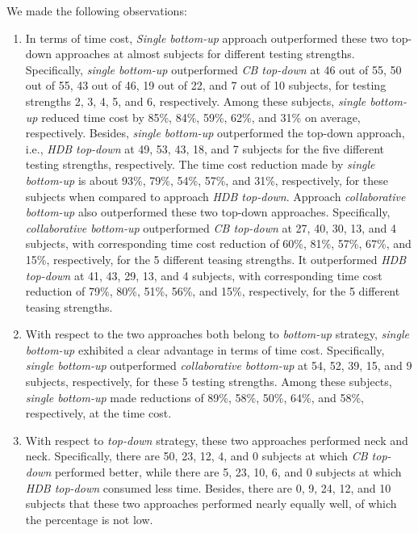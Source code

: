 \documentclass[conference]{IEEEtran}
\theoremstyle{definition}
\begin{document}
We made the following observations:
 \begin{enumerate}

 \item In terms of time cost, \emph{Single bottom-up} approach outperformed these two top-down approaches at almost subjects for different testing strengths.  Specifically, \emph{single bottom-up} outperformed \emph{CB top-down} at 46 out of 55, 50 out of 55, 43 out of 46, 19 out of 22, and 7 out of 10 subjects, for testing strengths 2, 3, 4, 5, and 6, respectively.
 Among these subjects, \emph{single bottom-up} reduced time cost by 85\%, 84\%, 59\%, 62\%, and 31\% on average, respectively. Besides, \emph{single bottom-up} outperformed the top-down approach, i.e., \emph{HDB top-down} at 49, 53, 43, 18, and 7 subjects for the five different testing strengths, respectively. The time cost reduction made by \emph{single bottom-up} is about 93\%, 79\%, 54\%, 57\%,  and  31\%, respectively, for these subjects when compared to approach \emph{HDB top-down}.  Approach \emph{collaborative bottom-up} also outperformed these two top-down approaches. Specifically, \emph{collaborative bottom-up} outperformed \emph{CB top-down} at 27, 40, 30, 13, and 4 subjects, with corresponding time cost reduction of 60\%, 81\%, 57\%, 67\%, and 15\%, respectively, for the 5 different teasing strengths.  It outperformed \emph{HDB top-down} at 41, 43, 29, 13, and 4 subjects, with corresponding time cost reduction of 79\%, 80\%, 51\%, 56\%, and 15\%, respectively, for the 5 different teasing strengths.

 \item With respect to the two approaches both belong to \emph{bottom-up} strategy, \emph{single bottom-up} exhibited a clear advantage in terms of time cost. Specifically, \emph{single bottom-up} outperformed  \emph{collaborative bottom-up}  at 54, 52, 39, 15, and 9 subjects, respectively, for these 5 testing strengths. Among these subjects,  \emph{single bottom-up} made reductions of  89\%, 58\%, 50\%, 64\%, and 58\%, respectively, at the time cost.

 \item  With respect to \emph{top-down} strategy, these two approaches performed neck and neck. Specifically, there are 50, 23, 12, 4, and 0 subjects at which \emph{CB top-down} performed better, while there are 5, 23, 10, 6, and 0 subjects at which \emph{HDB top-down} consumed less time. Besides, there are 0, 9, 24, 12, and 10 subjects that these two approaches performed nearly equally well, of which the percentage is not low.
\end{enumerate}
\end{document}
